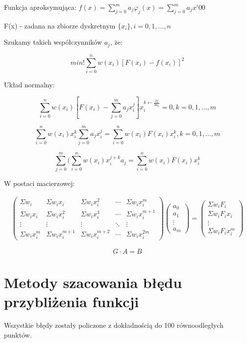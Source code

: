 \documentclass{article}
\begin{document}
\noindent
Funkcja aproksymująca: \(f(x) = \sum_{j=0}^{m}a_j\varphi_j(x) = \sum_{j=0}^{m}a_jx^i00\)

\noindent
F(x) - zadana na zbiorze dyskretnym \(\{x_i\}, i = 0, 1, ..., n\)

\noindent
Szukamy takich współczynników \(a_j\), że:

\[min!\sum_{i=0}^{n}w(x_i)[F(x_i) - f(x_i)]^2\]

\noindent
Układ normalny:

\[\sum_{i = 0}^{n}w(x_i)[F(x_i) - \sum_{j=0}^{m}a_jx_i^j]x_i^{k\longleftarrow \frac{\partial f}{\partial a_k}} = 0, k = 0, 1, ..., m\]

\[\sum_{i = 0}^{n}w(x_i)x_i^k\sum_{j=0}^{m}a_jx_i^j = \sum_{i=0}^{n}w(x_i)F(x_i)x_i^k, k =0,1,...,m\]

\[\sum_{j=0}^{m}(\sum_{i=0}^{n}w(x_i)x_i^{j+k}a_j = \sum_{i=0}^{n}w(x_i)F(x_i)x_i^k\]

\noindent
W postaci macierzowej:

\begin{gather*}
\begin{pmatrix}
\Sigma w_i & \Sigma w_ix_i & \Sigma w_ix_i^2 & \cdots & \Sigma w_ix_i^m \\
\Sigma w_ix_i & \Sigma w_ix_i^2 & \Sigma w_ix_i^3 & \cdots & \Sigma w_ix_i^{m+1} \\
\vdots & \vdots & \vdots & \ddots & \vdots \\
\Sigma w_ix_i^m & \Sigma w_ix_i^{m+1} & \Sigma w_ix_i^{m+2} & \cdots & \Sigma w_ix_i^{2m} 
\end{pmatrix} 
\begin{pmatrix}
a_0 \\
a_1 \\
\vdots \\
a_m 
\end{pmatrix}
= 
\begin{pmatrix}
\Sigma w_iF_i \\
\Sigma w_iF_ix_i \\
\vdots \\
\Sigma w_iF_ix_i^m 
\end{pmatrix}
\end{gather*}

\[G \cdot A=B\]

\section{Metody szacowania błędu przybliżenia funkcji}

Wszystkie błędy zostały policzone z dokładnością do 100 równoodległych punktów.
\end{document}
